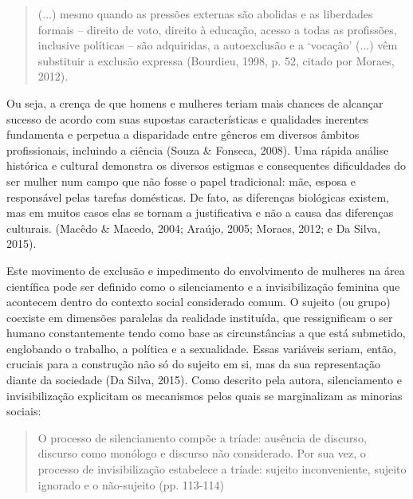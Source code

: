 \begin{quote}
(...) mesmo quando as pressões externas são abolidas e as liberdades formais – direito de voto, direito à educação, acesso a todas as profissões, inclusive políticas – são adquiridas, a autoexclusão e a ‘vocação’ (...) vêm substituir a exclusão expressa (Bourdieu, 1998, p. 52, citado por Moraes, 2012).
\end{quote}

Ou seja, a crença de que homens e mulheres teriam mais chances de alcançar sucesso de acordo com suas supostas características e qualidades inerentes fundamenta e perpetua a disparidade entre gêneros em diversos âmbitos profissionais, incluindo a ciência (Souza \& Fonseca, 2008). Uma rápida análise histórica e cultural demonstra os diversos estigmas e consequentes dificuldades do ser mulher num campo que não fosse o papel tradicional: mãe, esposa e responsável pelas tarefas domésticas. De fato, as diferenças biológicas existem, mas em muitos casos elas se tornam a justificativa e não a causa das diferenças culturais. (Macêdo \& Macedo, 2004; Araújo, 2005; Moraes, 2012; e Da Silva, 2015).

Este movimento de exclusão e impedimento do envolvimento de mulheres na área científica pode ser definido como o silenciamento e a invisibilização feminina que acontecem dentro do contexto social considerado comum. O sujeito (ou grupo) coexiste em dimensões paralelas da realidade instituída, que ressignificam o ser humano constantemente tendo como base as circunstâncias a que está submetido, englobando o trabalho, a política e a sexualidade. Essas variáveis seriam, então, cruciais para a construção não só do sujeito em si, mas da sua representação diante da sociedade (Da Silva, 2015). Como descrito pela autora, silenciamento e invisibilização explicitam os mecanismos pelos quais se marginalizam as minorias sociais:

\begin{quote}
O processo de silenciamento compõe a tríade: ausência de discurso, discurso como monólogo e discurso não considerado. Por sua vez, o processo de invisibilização estabelece a tríade: sujeito inconveniente, sujeito ignorado e o não-sujeito (pp. 113-114)
\end{quote}


